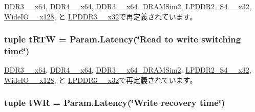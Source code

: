 \hyperlink{classDRAMCtrl_1_1DDR3__1600__x64_ac0793c2fe127d7331efb7012e82dae77}{DDR3\_\_\-x64}, \hyperlink{classDRAMCtrl_1_1DDR4__2400__x64_ac0793c2fe127d7331efb7012e82dae77}{DDR4\_\_\-x64}, \hyperlink{classDRAMCtrl_1_1DDR3__1333__x64__DRAMSim2_ac0793c2fe127d7331efb7012e82dae77}{DDR3\_\_\-x64\_\-DRAMSim2}, \hyperlink{classDRAMCtrl_1_1LPDDR2__S4__1066__x32_ac0793c2fe127d7331efb7012e82dae77}{LPDDR2\_\-S4\_\_\-x32}, \hyperlink{classDRAMCtrl_1_1WideIO__200__x128_ac0793c2fe127d7331efb7012e82dae77}{WideIO\_\_\-x128}, と \hyperlink{classDRAMCtrl_1_1LPDDR3__1600__x32_ac0793c2fe127d7331efb7012e82dae77}{LPDDR3\_\_\-x32}で再定義されています。\hypertarget{classDRAMCtrl_1_1DRAMCtrl_ae9c14c1c8f7db3710dff2c3f7477dd73}{
\subsubsection[{tRTW}]{\setlength{\rightskip}{0pt plus 5cm}tuple {\bf tRTW} = Param.Latency(\char`\"{}Read to write switching time\char`\"{})}}
\label{classDRAMCtrl_1_1DRAMCtrl_ae9c14c1c8f7db3710dff2c3f7477dd73}


\hyperlink{classDRAMCtrl_1_1DDR3__1600__x64_acbc9a68ca72d4052b4dd232251436d23}{DDR3\_\_\-x64}, \hyperlink{classDRAMCtrl_1_1DDR4__2400__x64_acbc9a68ca72d4052b4dd232251436d23}{DDR4\_\_\-x64}, \hyperlink{classDRAMCtrl_1_1DDR3__1333__x64__DRAMSim2_acbc9a68ca72d4052b4dd232251436d23}{DDR3\_\_\-x64\_\-DRAMSim2}, \hyperlink{classDRAMCtrl_1_1LPDDR2__S4__1066__x32_acbc9a68ca72d4052b4dd232251436d23}{LPDDR2\_\-S4\_\_\-x32}, \hyperlink{classDRAMCtrl_1_1WideIO__200__x128_acbc9a68ca72d4052b4dd232251436d23}{WideIO\_\_\-x128}, と \hyperlink{classDRAMCtrl_1_1LPDDR3__1600__x32_acbc9a68ca72d4052b4dd232251436d23}{LPDDR3\_\_\-x32}で再定義されています。\hypertarget{classDRAMCtrl_1_1DRAMCtrl_a697ccc69ed7565c11123843aa79fc126}{
\subsubsection[{tWR}]{\setlength{\rightskip}{0pt plus 5cm}tuple {\bf tWR} = Param.Latency(\char`\"{}Write recovery time\char`\"{})}}
\label{classDRAMCtrl_1_1DRAMCtrl_a697ccc69ed7565c11123843aa79fc126}


